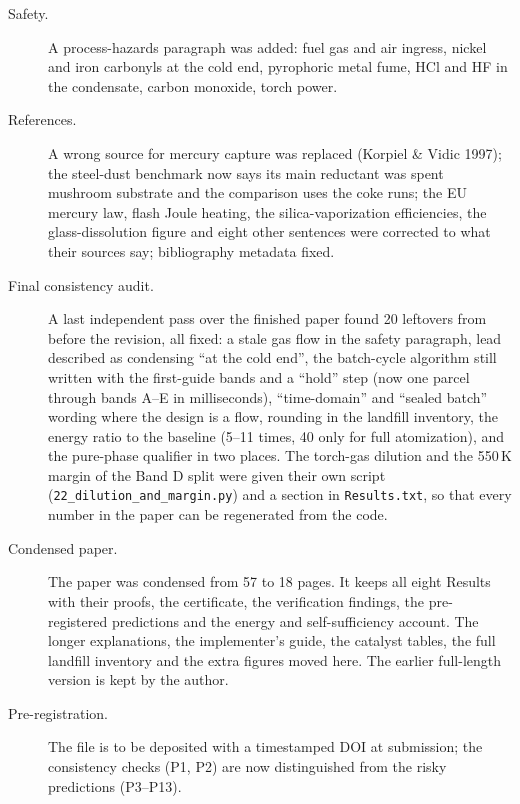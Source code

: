 \documentclass[11pt,a4paper]{article}
\begin{document}
\begin{description}
\item[Safety.] A process-hazards paragraph was added: fuel gas and air ingress, nickel and iron carbonyls at the cold end, pyrophoric metal fume, HCl and HF in the condensate, carbon monoxide, torch power.
\item[References.] A wrong source for mercury capture was replaced (Korpiel \& Vidic 1997); the steel-dust benchmark now says its main reductant was spent mushroom substrate and the comparison uses the coke runs; the EU mercury law, flash Joule heating, the silica-vaporization efficiencies, the glass-dissolution figure and eight other sentences were corrected to what their sources say; bibliography metadata fixed.
\item[Final consistency audit.] A last independent pass over the finished paper found 20 leftovers from before the revision, all fixed: a stale gas flow in the safety paragraph, lead described as condensing ``at the cold end'', the batch-cycle algorithm still written with the first-guide bands and a ``hold'' step (now one parcel through bands A--E in milliseconds), ``time-domain'' and ``sealed batch'' wording where the design is a flow, rounding in the landfill inventory, the energy ratio to the baseline (5--11 times, 40 only for full atomization), and the pure-phase qualifier in two places. The torch-gas dilution and the 550\,K margin of the Band D split were given their own script (\texttt{22\_dilution\_and\_margin.py}) and a section in \texttt{Results.txt}, so that every number in the paper can be regenerated from the code.
\item[Condensed paper.] The paper was condensed from 57 to 18 pages. It keeps all eight Results with their proofs, the certificate, the verification findings, the pre-registered predictions and the energy and self-sufficiency account. The longer explanations, the implementer's guide, the catalyst tables, the full landfill inventory and the extra figures moved here. The earlier full-length version is kept by the author.
\item[Pre-registration.] The file is to be deposited with a timestamped DOI at submission; the consistency checks (P1, P2) are now distinguished from the risky predictions (P3--P13).
\end{description}

\end{document}
